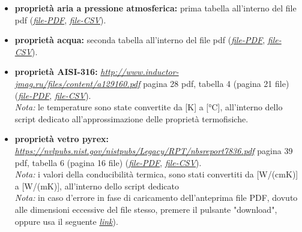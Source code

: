 \documentclass[a4paper,10pt]{article}                                                                                       %
\begin{document}
  \begin{itemize}                                                                                                           %
    \item \textbf{proprietà aria a pressione atmosferica:}
      prima tabella all'interno del file pdf
      (\textit{\href{https://github.com/CristianMerli/DataAnalysis/blob/master/lab_doc/TabelleAriaAcqua.pdf}{file-PDF}},
      \textit{\href{https://github.com/CristianMerli/DataAnalysis/blob/master/data_analysis/thermophys_vars/air_atmp_thermo_vars.csv}{file-CSV}}).
    \item \textbf{proprietà acqua:}
      seconda tabella all'interno del file pdf
      (\textit{\href{https://github.com/CristianMerli/DataAnalysis/blob/master/lab_doc/TabelleAriaAcqua.pdf}{file-PDF}},
      \textit{\href{https://github.com/CristianMerli/DataAnalysis/blob/master/data_analysis/thermophys_vars/water_thermo_vars.csv}{file-CSV}}).
    \item \textbf{proprietà AISI-316:}
      \textit{\href{http://www.inductor-jmag.ru/files/content/a129160.pdf}{http://www.inductor-jmag.ru/files/content/a129160.pdf}}
      pagina 28 pdf, tabella 4 (pagina 21 file)
      (\textit{\href{https://github.com/CristianMerli/DataAnalysis/blob/master/lab_doc/AISI316.pdf}{file-PDF}},
      \textit{\href{https://github.com/CristianMerli/DataAnalysis/blob/master/data_analysis/thermophys_vars/aisi_316_thermo_vars.csv}{file-CSV}}).
      \vspace{1.5mm}\\\textit{Nota:} le temperature sono state convertite da [K] a [°C], all'interno dello script dedicato
      all'approssimazione delle proprietà termofisiche.
    \item \textbf{proprietà vetro pyrex:}
      \textit{\href{https://nvlpubs.nist.gov/nistpubs/Legacy/RPT/nbsreport7836.pdf}{https://nvlpubs.nist.gov/nistpubs/Legacy/RPT/nbsreport7836.pdf}}
      pagina 39 pdf, tabella 6 (pagina 16 file)
      (\textit{\href{https://github.com/CristianMerli/DataAnalysis/blob/master/lab_doc/Pyrex_glass.pdf}{file-PDF}},
      \textit{\href{https://github.com/CristianMerli/DataAnalysis/blob/master/data_analysis/thermophys_vars/pyrex_glass_thermo_vars.csv}{file-CSV}}).
      \vspace{1.5mm}\\\textit{Nota:} i valori della conducibilità termica, sono stati convertiti da [W/(cm\*K)] a
      [W/(m\*K)], all'interno dello script dedicato
      \vspace{1.5mm}\\\textit{Nota:} in caso d'errore in fase di caricamento dell'anteprima file PDF, dovuto alle
      dimensioni eccessive del file stesso, premere il pulsante "download", oppure usa il seguente
      \textit{\href{https://github.com/CristianMerli/DataAnalysis/raw/master/lab_doc/Pyrex_glass.pdf}{link}}).
  \end{itemize}                                                                                                             %
\end{document}
